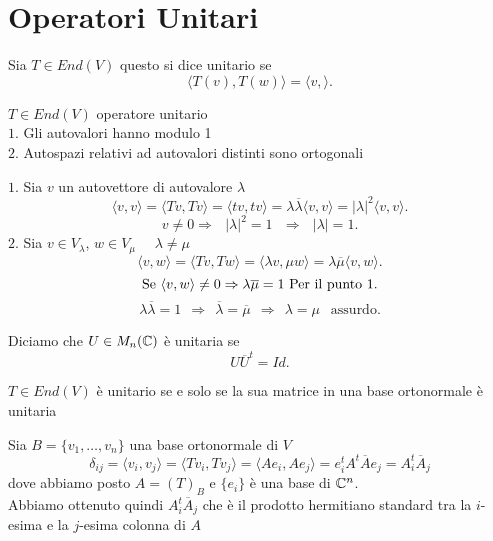 \documentclass[12px]{article}
\begin{document}
\section{Operatori Unitari}
\begin{defi}
	Sia $T\in End(V)$ questo si dice unitario se
	\[
	\langle T(v), T(w) \rangle = \langle v,  \rangle 
	.\] 
\end{defi}
\begin{lemm}
$T\in End(V)$ operatore unitario\\
$1.$ Gli autovalori hanno modulo 1\\
$2.$ Autospazi relativi ad autovalori distinti sono ortogonali\\
\end{lemm}
\begin{dimo}
$1.$ Sia $v$ un autovettore di autovalore $\lambda$ 
\[
	\langle v, v \rangle = \langle Tv, Tv \rangle  = \langle tv, tv \rangle  = \lambda\overline{\lambda} \langle v, v \rangle = |\lambda|^2 \langle v, v \rangle 
.\] 
\[
v \neq 0 \Rightarrow  \ \ \ |\lambda|^2 = 1 \ \ \  \Rightarrow  \ \ \ |\lambda| = 1
.\] 
$2.$ Sia $v\in V_\lambda$, $w\in V_\mu$ \ \ $\lambda\neq\mu$
\[
	\langle v, w \rangle  = \langle Tv, Tw \rangle = \langle \lambda v, \mu w \rangle = \lambda\overline{\mu} \langle v, w \rangle 
.\] 
\[\text {Se } \langle v, w \rangle \neq 0  \Rightarrow \lambda \overline{\mu} = 1 \text{ Per il punto 1}\\
	.\]\[
	\lambda\overline{\lambda} =1\ \ \Rightarrow \ \ \overline{\lambda} = \overline{\mu} \ \ \Rightarrow \ \ \lambda = \mu \ \ \text{ assurdo}
.\] 
\end{dimo}
\begin{defi}
	Diciamo che $U\in M_n(\mathbb{C})$ è unitaria se 
	\[
		U\overline{U}^t = Id
	.\] 
\end{defi}
\begin{prop}
	$T\in End(V)$ è unitario se e solo se la sua matrice in una base ortonormale è unitaria
\end{prop}
\begin{dimo}
	Sia $B = \{v_1,\ldots,v_n\}$ una base ortonormale di $V$ 
	\[
		\delta_{ij} = \langle v_i, v_j \rangle  = \langle Tv_i, Tv_j \rangle  = \langle Ae_i, Ae_j \rangle = e_i^tA^t\overline{A}e_j = A_i^t\overline{A}_j
	\] 
	dove abbiamo posto $A = (T)_B$ e $\{e_i\}$ è una base di $\mathbb{C}^n$.\\
	Abbiamo ottenuto quindi $A_i^t\overline{A}_j$ che è il prodotto hermitiano standard tra la $i$-esima e la $j$-esima colonna di $A$
\end{dimo}
\end{document}
